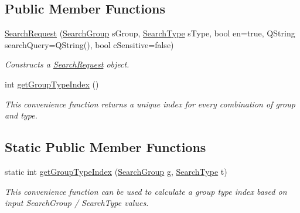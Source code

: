 \subsection*{Public Member Functions}
\begin{DoxyCompactItemize}
\item 
\hyperlink{struct_search_request_a501416cff8d8a32b39d6bde48b8a65b5}{Search\-Request} (\hyperlink{struct_search_request_a9cbf0fa4db86fccb45d34cc7d254dd53}{Search\-Group} s\-Group, \hyperlink{struct_search_request_a715ada4359cbb4eacc24e02015445dc7}{Search\-Type} s\-Type, bool en=true, Q\-String search\-Query=Q\-String(), bool c\-Sensitive=false)
\begin{DoxyCompactList}\small\item\em Constructs a \hyperlink{struct_search_request}{Search\-Request} object. \end{DoxyCompactList}\item 
\hypertarget{struct_search_request_afdd399870eb853d06f85eaa06d66b589}{int \hyperlink{struct_search_request_afdd399870eb853d06f85eaa06d66b589}{get\-Group\-Type\-Index} ()}\label{struct_search_request_afdd399870eb853d06f85eaa06d66b589}

\begin{DoxyCompactList}\small\item\em This convenience function returns a unique index for every combination of group and type. \end{DoxyCompactList}\end{DoxyCompactItemize}
\subsection*{Static Public Member Functions}
\begin{DoxyCompactItemize}
\item 
\hypertarget{struct_search_request_a903b8222a6552167bbd2027386102043}{static int \hyperlink{struct_search_request_a903b8222a6552167bbd2027386102043}{get\-Group\-Type\-Index} (\hyperlink{struct_search_request_a9cbf0fa4db86fccb45d34cc7d254dd53}{Search\-Group} g, \hyperlink{struct_search_request_a715ada4359cbb4eacc24e02015445dc7}{Search\-Type} t)}\label{struct_search_request_a903b8222a6552167bbd2027386102043}

\begin{DoxyCompactList}\small\item\em This convenience function can be used to calculate a group type index based on input Search\-Group / Search\-Type values. \end{DoxyCompactList}\end{DoxyCompactItemize}
